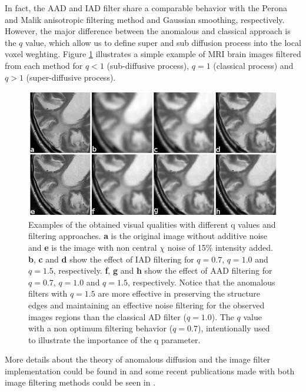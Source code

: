 \documentclass{InsightArticle}
\begin{document}
In fact, the AAD and IAD filter share a comparable behavior with the Perona and Malik anisotropic filtering method and Gaussian smoothing, respectively. However, the major difference between the anomalous and classical approach is the $q$ value, which allow us to define super and sub diffusion process into the local voxel weghting. Figure \ref{Fig:ExamplesImages} illustrates a simple example of MRI brain images filtered from each method for $q<1$ (sub-diffusive process), $q=1$ (classical process) and $q>1$ (super-diffusive process).

\begin{figure}[ht]
\centering
 \includegraphics[width=16cm]{Img/figure5.png}
\caption{Examples of the obtained visual qualities with different q values and filtering approaches. \textbf{a} is the original image without additive noise and \textbf{e} is the image with non central $\chi$ noise of 15\% intensity added. \textbf{b}, \textbf{c} and \textbf{d} show the effect of IAD filtering for $q = 0.7$, $q = 1.0$ and $q = 1.5$, respectively. \textbf{f}, \textbf{g} and \textbf{h} show the effect of AAD filtering for $q = 0.7$, $q = 1.0$ and $q = 1.5$, respectively. Notice that the anomalous filters with $q = 1.5$ are more effective in preserving the structure edges and maintaining an effective noise filtering for the observed images regions than the classical AD filter ($q = 1.0$). The $q$ value with a non optimum filtering behavior ($q = 0.7$), intentionally used to illustrate the importance of the q parameter.}
\label{Fig:ExamplesImages}
\end{figure}

More details about the theory of anomalous diffusion and the image filter implementation could be found in \cite{SenraFilho2015} and some recent publications made with both image filtering methods could be seen in \cite{Filho2014b,Filho2014,Filho2014a,SenraFilhoCBEB2014,SenraFilho_EMBC2013,Filho2014c}.
\end{document}

